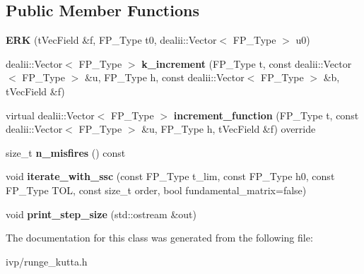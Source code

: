 \subsection*{Public Member Functions}
\begin{DoxyCompactItemize}
\item 
\mbox{\label{classERK_a600b2ded4e6baa75492d621b792c8493}} 
{\bfseries E\+RK} (t\+Vec\+Field \&f, F\+P\+\_\+\+Type t0, dealii\+::\+Vector$<$ F\+P\+\_\+\+Type $>$ u0)
\item 
\mbox{\label{classERK_a3c11900d43dfde8035ad6b077b36ea2b}} 
dealii\+::\+Vector$<$ F\+P\+\_\+\+Type $>$ {\bfseries k\+\_\+increment} (F\+P\+\_\+\+Type t, const dealii\+::\+Vector$<$ F\+P\+\_\+\+Type $>$ \&u, F\+P\+\_\+\+Type h, const dealii\+::\+Vector$<$ F\+P\+\_\+\+Type $>$ \&b, t\+Vec\+Field \&f)
\item 
\mbox{\label{classERK_a327c6d1744ea1af69832401ba5db4bf8}} 
virtual dealii\+::\+Vector$<$ F\+P\+\_\+\+Type $>$ {\bfseries increment\+\_\+function} (F\+P\+\_\+\+Type t, const dealii\+::\+Vector$<$ F\+P\+\_\+\+Type $>$ \&u, F\+P\+\_\+\+Type h, t\+Vec\+Field \&f) override
\item 
\mbox{\label{classERK_ae3f71b3f5364ffcab63a715d95adb911}} 
size\+\_\+t {\bfseries n\+\_\+misfires} () const
\item 
\mbox{\label{classERK_a579d1dca336908852a3a283dd97f13f8}} 
void {\bfseries iterate\+\_\+with\+\_\+ssc} (const F\+P\+\_\+\+Type t\+\_\+lim, const F\+P\+\_\+\+Type h0, const F\+P\+\_\+\+Type T\+OL, const size\+\_\+t order, bool fundamental\+\_\+matrix=false)
\item 
\mbox{\label{classERK_a6057b70fbd97bbe2e5b2d0233aef46a4}} 
void {\bfseries print\+\_\+step\+\_\+size} (std\+::ostream \&out)
\end{DoxyCompactItemize}


The documentation for this class was generated from the following file\+:\begin{DoxyCompactItemize}
\item 
ivp/runge\+\_\+kutta.\+h\end{DoxyCompactItemize}
